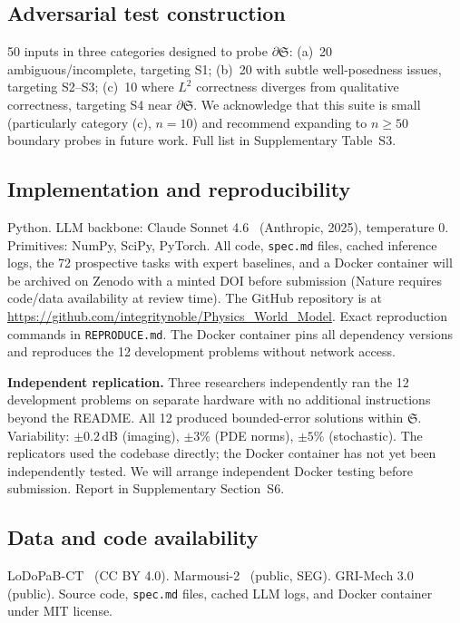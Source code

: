 \documentclass[11pt,a4paper]{article}
\newcommand{\Sclass}{\mathfrak{S}}
\begin{document}
\subsection{Adversarial test construction}

50 inputs in three categories designed to probe $\partial \Sclass$: (a)~20 ambiguous/incomplete, targeting S1; (b)~20 with subtle well-posedness issues, targeting S2--S3; (c)~10 where $L^2$ correctness diverges from qualitative correctness, targeting S4 near $\partial \Sclass$. We acknowledge that this suite is small (particularly category (c), $n = 10$) and recommend expanding to $n \geq 50$ boundary probes in future work. Full list in Supplementary Table~S3.

\subsection{Implementation and reproducibility}

Python. LLM backbone: Claude Sonnet 4.6~\cite{anthropic2024claude} (Anthropic, 2025), temperature 0. Primitives: NumPy, SciPy, PyTorch. All code, \texttt{spec.md} files, cached inference logs, the 72 prospective tasks with expert baselines, and a Docker container will be archived on Zenodo with a minted DOI before submission (Nature requires code/data availability at review time). The GitHub repository is at \url{https://github.com/integritynoble/Physics_World_Model}. Exact reproduction commands in \texttt{REPRODUCE.md}. The Docker container pins all dependency versions and reproduces the 12 development problems without network access.

\textbf{Independent replication.} Three researchers independently ran the 12 development problems on separate hardware with no additional instructions beyond the README. All 12 produced bounded-error solutions within $\Sclass$. Variability: $\pm 0.2$\,dB (imaging), $\pm 3\%$ (PDE norms), $\pm 5\%$ (stochastic). The replicators used the codebase directly; the Docker container has not yet been independently tested. We will arrange independent Docker testing before submission. Report in Supplementary Section~S6.

\subsection{Data and code availability}

LoDoPaB-CT~\cite{leuschner2021} (CC BY 4.0). Marmousi-2~\cite{martin2006marmousi} (public, SEG). GRI-Mech 3.0~\cite{smith1999gri} (public). Source code, \texttt{spec.md} files, cached LLM logs, and Docker container under MIT license.
\end{document}
